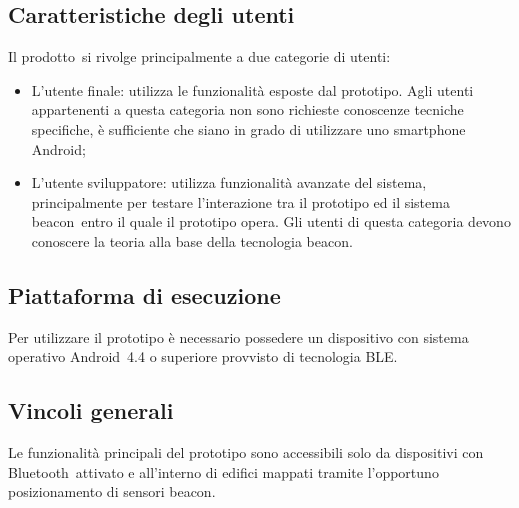 \documentclass[../AnalisiDeiRequisiti.tex]{subfiles}
\begin{document}
	\subsection{Caratteristiche degli utenti} 
	Il prodotto\g\ si rivolge principalmente a due categorie di utenti:
	\begin{itemize}
		\item L'utente finale: utilizza le funzionalità esposte dal prototipo. Agli utenti appartenenti a questa categoria non sono richieste conoscenze tecniche specifiche, è sufficiente che siano in grado di utilizzare uno smartphone Android\g;
		\item L'utente sviluppatore: utilizza funzionalità avanzate del sistema, principalmente per testare l'interazione tra il prototipo ed il sistema beacon\g\ entro il quale il prototipo opera. Gli utenti di questa categoria devono conoscere la teoria alla base della tecnologia beacon\g.
	\end{itemize}
	
	\subsection{Piattaforma di esecuzione}
	Per utilizzare il prototipo è necessario possedere un dispositivo con sistema operativo Android\g\ 4.4 o superiore provvisto di tecnologia BLE\g.
	
	\subsection{Vincoli generali}
	Le funzionalità principali del prototipo sono accessibili solo da dispositivi con Bluetooth\g\ attivato e all'interno di edifici mappati tramite l'opportuno posizionamento di sensori beacon\g.
\end{document}

